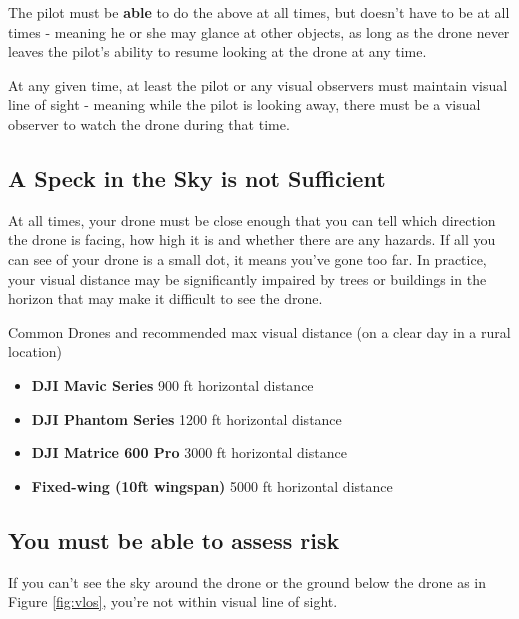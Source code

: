 \documentclass[
]{book}
\providecommand{\tightlist}{%
  \setlength{\itemsep}{0pt}\setlength{\parskip}{0pt}}
\begin{document}
The pilot must be \textbf{able} to do the above at all times, but doesn't have to be at all times - meaning he or she may glance at other objects, as long as the drone never leaves the pilot's ability to resume looking at the drone at any time.

At any given time, at least the pilot or any visual observers must maintain visual line of sight - meaning while the pilot is looking away, there must be a visual observer to watch the drone during that time.

\hypertarget{a-speck-in-the-sky-is-not-sufficient}{%
\subsection{A Speck in the Sky is not Sufficient}\label{a-speck-in-the-sky-is-not-sufficient}}

At all times, your drone must be close enough that you can tell which direction the drone is facing, how high it is and whether there are any hazards. If all you can see of your drone is a small dot, it means you've gone too far. In practice, your visual distance may be significantly impaired by trees or buildings in the horizon that may make it difficult to see the drone.

Common Drones and recommended max visual distance (on a clear day in a rural location)

\begin{itemize}
\tightlist
\item
  \textbf{DJI Mavic Series} 900 ft horizontal distance
\item
  \textbf{DJI Phantom Series} 1200 ft horizontal distance
\item
  \textbf{DJI Matrice 600 Pro} 3000 ft horizontal distance
\item
  \textbf{Fixed-wing (10ft wingspan)} 5000 ft horizontal distance
\end{itemize}

\hypertarget{you-must-be-able-to-assess-risk}{%
\subsection{You must be able to assess risk}\label{you-must-be-able-to-assess-risk}}

If you can't see the sky around the drone or the ground below the drone as in Figure \ref{fig:vlos}, you're not within visual line of sight.
\end{document}
